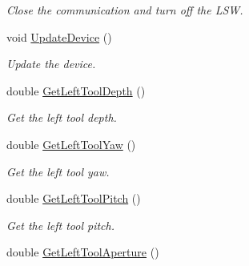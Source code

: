 \begin{DoxyCompactItemize}
\begin{DoxyCompactList}\small\item\em Close the communication and turn off the LSW. \item\end{DoxyCompactList}\item 
\hypertarget{classvtkLSW_a9e4792570b3b6389fa63578b4de108af}{
void \hyperlink{classvtkLSW_a9e4792570b3b6389fa63578b4de108af}{UpdateDevice} ()}
\label{classvtkLSW_a9e4792570b3b6389fa63578b4de108af}

\begin{DoxyCompactList}\small\item\em Update the device. \item\end{DoxyCompactList}\item 
\hypertarget{classvtkLSW_a8484218389c5417d8f74c968b6ad9069}{
double \hyperlink{classvtkLSW_a8484218389c5417d8f74c968b6ad9069}{GetLeftToolDepth} ()}
\label{classvtkLSW_a8484218389c5417d8f74c968b6ad9069}

\begin{DoxyCompactList}\small\item\em Get the left tool depth. \item\end{DoxyCompactList}\item 
\hypertarget{classvtkLSW_a95b07574363500a9d93181bf96b89a78}{
double \hyperlink{classvtkLSW_a95b07574363500a9d93181bf96b89a78}{GetLeftToolYaw} ()}
\label{classvtkLSW_a95b07574363500a9d93181bf96b89a78}

\begin{DoxyCompactList}\small\item\em Get the left tool yaw. \item\end{DoxyCompactList}\item 
\hypertarget{classvtkLSW_aaf14dbb18fbc385988cc9a00f5ae2b9d}{
double \hyperlink{classvtkLSW_aaf14dbb18fbc385988cc9a00f5ae2b9d}{GetLeftToolPitch} ()}
\label{classvtkLSW_aaf14dbb18fbc385988cc9a00f5ae2b9d}

\begin{DoxyCompactList}\small\item\em Get the left tool pitch. \item\end{DoxyCompactList}\item 
\hypertarget{classvtkLSW_a99e809a8e4ccf5f39461509cfbf78330}{
double \hyperlink{classvtkLSW_a99e809a8e4ccf5f39461509cfbf78330}{GetLeftToolAperture} ()}
\label{classvtkLSW_a99e809a8e4ccf5f39461509cfbf78330}


\end{DoxyCompactItemize}

